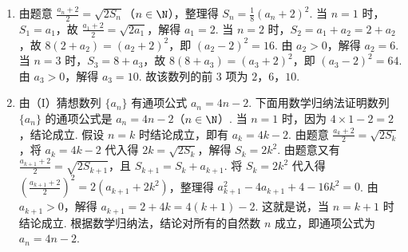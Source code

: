 \documentclass[UTF8,a4paper,oneside,11pt]{ctexbook}
\begin{document}
\begin{solution}
\begin{enumerate}
\item 由题意 \(\frac{a_n + 2}{2} = \sqrt{2S_n}\)（\(n \in \N\)），整理得 \(S_n = \frac{1}{8}\left(a_n + 2\right)^2\). 当 \(n = 1\) 时，\(S_1 = a_1\)，故 \(\frac{a_1 + 2}{2} = \sqrt{2a_1}\)，解得 \(a_1 = 2\). 当 \(n = 2\) 时，\(S_2 = a_1 + a_2 = 2 + a_2\)，故 \(8(2 + a_2) = \left(a_2 + 2\right)^2\)，即 \(\left(a_2 - 2\right)^2 = 16\). 由 \(a_2 > 0\)，解得 \(a_2 = 6\). 当 \(n = 3\) 时，\(S_3 = 8 + a_3\)，故 \(8(8 + a_3) = \left(a_3 + 2\right)^2\)，即 \(\left(a_3 - 2\right)^2 = 64\). 由 \(a_3 > 0\)，解得 \(a_3 = 10\). 故该数列的前 \(3\) 项为 \(2\)，\(6\)，\(10\).
\item 由（I）猜想数列 \(\{a_n\}\) 有通项公式 \(a_n = 4n - 2\). 下面用数学归纳法证明数列 \(\{a_n\}\) 的通项公式是 \(a_n = 4n - 2\)（\(n \in \N\)）. 当 \(n = 1\) 时，因为 \(4 \times 1 - 2 = 2\)，结论成立. 假设 \(n = k\) 时结论成立，即有 \(a_k = 4k - 2\). 由题意 \(\frac{a_k + 2}{2} = \sqrt{2S_k}\)，将 \(a_k = 4k - 2\) 代入得 \(2k = \sqrt{2S_k}\)，解得 \(S_k = 2k^2\). 由题意又有 \(\frac{a_{k+1} + 2}{2} = \sqrt{2S_{k+1}}\)，且 \(S_{k+1} = S_k + a_{k+1}\). 将 \(S_k = 2k^2\) 代入得 \(\left(\frac{a_{k+1} + 2}{2}\right)^2 = 2\left(a_{k+1} + 2k^2\right)\)，整理得 \(a_{k+1}^2 - 4a_{k+1} + 4 - 16k^2 = 0\). 由 \(a_{k+1} > 0\)，解得 \(a_{k+1} = 2 + 4k = 4(k + 1) - 2\). 这就是说，当 \(n = k + 1\) 时结论成立. 根据数学归纳法，结论对所有的自然数 \(n\) 成立，即通项公式为 \(a_n = 4n - 2\).
\end{enumerate}
\end{solution}

\end{document}
